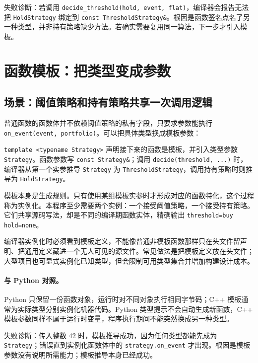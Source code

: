 失败诊断：若调用 \texttt{decide\_threshold(hold, event, flat)}，编译器会报告无法把 \texttt{HoldStrategy} 绑定到 \texttt{const ThresholdStrategy\&}。根因是函数签名点名了另一种类型，并非持有策略缺少方法。若确实需要复用同一算法，下一步才引入模板。

\section{函数模板：把类型变成参数}

\subsection{场景：阈值策略和持有策略共享一次调用逻辑}

普通函数的函数体并不依赖阈值策略的私有字段，只要求参数能执行 \texttt{on\_event(event, portfolio)}。可以把具体类型换成模板参数：



\texttt{template <typename Strategy>} 声明接下来的函数是模板，并引入类型参数 \texttt{Strategy}。函数参数写 \texttt{const Strategy\&}；调用 \texttt{decide(threshold, ...)} 时，编译器从第一个实参推导 \texttt{Strategy} 为 \texttt{ThresholdStrategy}，调用持有策略时则推导为 \texttt{HoldStrategy}。

模板本身是生成规则。只有使用某组模板实参时才形成对应的函数特化，这个过程称为实例化。本程序至少需要两个实例：一个接受阈值策略，一个接受持有策略。它们共享源码写法，却是不同的编译期函数实体，精确输出 \texttt{threshold=buy hold=none}。

编译器实例化时必须看到模板定义，不能像普通非模板函数那样只在头文件留声明、把通用定义藏进一个无人可见的源文件。常见做法是把模板定义放在头文件；大型项目也可显式实例化已知类型，但会限制可用类型集合并增加构建设计成本。

\paragraph{与 Python 对照。}
Python 只保留一份函数对象，运行时对不同对象执行相同字节码；C++ 模板通常为实际类型分别实例化机器代码。Python 类型提示不会自动生成新函数，C++ 模板参数同样不属于运行时变量，程序执行期间不能突然换成另一种类型。

失败诊断：传入整数 42 时，模板推导成功，因为任何类型都能先成为 \texttt{Strategy}；错误直到实例化函数体中的 \texttt{strategy.on\_event} 才出现。根因是模板参数没有说明所需能力；模板推导本身已经成功。

